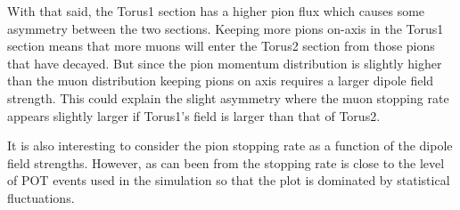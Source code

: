 
With that said, the Torus1 section has a higher pion flux which causes some asymmetry between the two sections.
Keeping more pions on-axis in the Torus1 section means that more muons will enter the Torus2 section from those pions that have decayed.
But since the pion momentum distribution is slightly higher than the muon distribution keeping pions on axis requires a larger dipole field strength.
This could explain the slight asymmetry where the muon stopping rate appears slightly larger if Torus1's field is larger than that of Torus2.

It is also interesting to consider the pion stopping rate as a function of the dipole field strengths.
However, as can been from  the stopping rate is close to the level of POT events used in the simulation so that the plot is dominated by statistical fluctuations.

